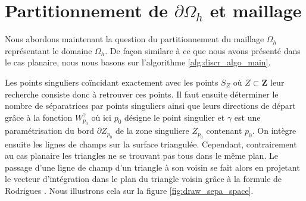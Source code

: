 \section{Partitionnement de $\partial\Omega_h$ et maillage}

Nous abordons maintenant la question du partitionnement du maillage $\Omega_h$ représentant le domaine $\Omega_h$. De façon similare à ce que nous avons présenté dans le cas planaire, nous nous basons sur l'algorithme \ref{alg:discr_algo_main}.

Les points singuliers coïncidant exactement avec les points $S_Z$ où $Z\subset\mathbf{Z}$ leur recherche consiste donc à retrouver ces points. Il faut ensuite déterminer le nombre de séparatrices par points singuliers ainsi que leurs directions de départ grâce à la fonction $W_{p_0}^\gamma$ où ici $p_0$ désigne le point singulier et $\gamma$ est une paramétrisation du bord $\partial Z_{p_0}$ de la zone singuliere $Z_{p_0}$ contenant $p_0$. On intègre ensuite les lignes de champs sur la surface triangulée. Cependant, contrairement au cas planaire les triangles ne se trouvant pas tous dans le même plan. Le passage d'une ligne de champ d'un triangle à son voisin se fait alors en projetant le vecteur d'intégration dans le plan du triangle voisin grâce à la formule de Rodrigues \cite{trucco1998introductory}. Nous illustrons cela sur la figure
\ref{fig:draw_sepa_space}.

